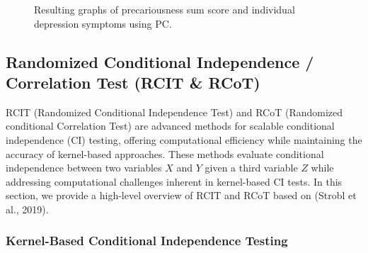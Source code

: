 \documentclass[
]{article}
\begin{document}
\begin{figure}


\caption{\label{fig-pc_presum}Resulting graphs of precariousness sum
score and individual depression symptoms using PC.}

\end{figure}%

\clearpage

\subsection{Randomized Conditional Independence / Correlation Test (RCIT
\& RCoT)}\label{sec-rcot}

RCIT (Randomized Conditional Independence Test) and RCoT (Randomized
conditional Correlation Test) are advanced methods for scalable
conditional independence (CI) testing, offering computational efficiency
while maintaining the accuracy of kernel-based approaches. These methods
evaluate conditional independence between two variables \(X\) and \(Y\)
given a third variable \(Z\) while addressing computational challenges
inherent in kernel-based CI tests. In this section, we provide a
high-level overview of RCIT and RCoT based on (Strobl et al., 2019).

\subsubsection{Kernel-Based Conditional Independence
Testing}\label{kernel-based-conditional-independence-testing}
\end{document}
